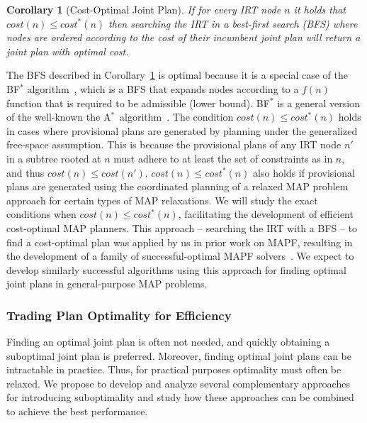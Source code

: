 \documentclass[11pt]{article}
\newcommand{\astar}{A$^*$}
\newtheorem{corollary}{Corollary}
\begin{document}
\begin{corollary}[Cost-Optimal Joint Plan]
If for every IRT node $n$ it holds that $cost(n)\leq cost^*(n)$ then searching the IRT in a best-first search (BFS) where nodes are ordered according to the cost of their incumbent joint plan 
will return a joint plan with optimal cost. 
\label{cor:optimal}
\end{corollary}
The BFS described in Corollary~\ref{cor:optimal} is optimal because it is a special case of the BF$^*$ algorithm~\cite{dechter1985generalized}, which is a BFS that expands nodes according to a $f(n)$ function that is required to be admissible (lower bound). BF$^*$ is a general version of the well-known the \astar\ algorithm~\cite{dechter1985generalized,hart1968formal}. 
The condition $cost(n)\leq cost^*(n)$ holds in cases where provisional plans are generated by planning under the generalized free-space assumption. 
This is because the provisional plans of any IRT node $n'$ in a subtree rooted at $n$ must adhere to at least the set of constraints as in $n$, and thus $cost(n)\leq cost(n')$. $cost(n)\leq cost^*(n)$ also holds if provisional plans are generated using the coordinated planning of a relaxed MAP problem approach for certain types of MAP relaxations. We will study the exact conditions when $cost(n)\leq cost^*(n)$, facilitating the development of efficient cost-optimal MAP planners. 
This approach -- searching the IRT with a BFS -- to find a cost-optimal plan was applied by us in prior work on MAPF, resulting in the development of a family of successful-optimal MAPF solvers~\cite{sharon2015conflict-based,boyarski2015don,boyarski2015icbs}. We expect to develop similarly successful algorithms using this approach for finding optimal joint plans in general-purpose MAP problems. 



\subsubsection{Trading Plan Optimality for Efficiency}
\label{sec:tradingPlan1}
Finding an optimal joint plan is often not needed, and quickly obtaining a suboptimal joint plan is preferred. %
Moreover, finding optimal joint plans can be intractable in practice. Thus, for practical purposes optimality must often be relaxed. We propose to develop and analyze several complementary approaches for introducing suboptimality and study how these approaches can be combined to achieve the best performance. 
\end{document}
